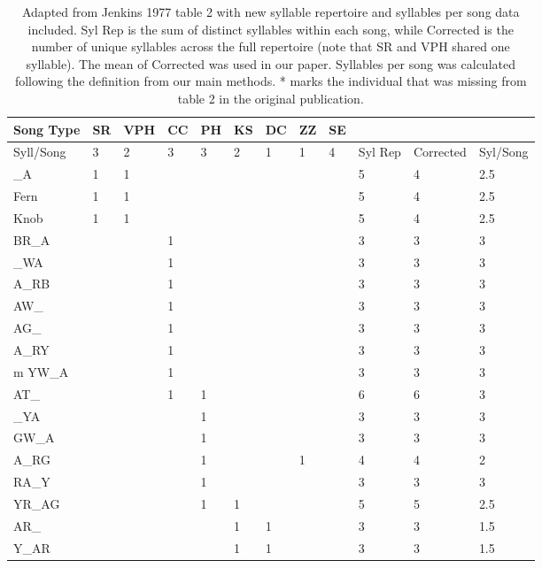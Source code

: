 \documentclass[a4paper,12pt]{article}
\begin{document}
\begin{table}[ht]
\caption{Adapted from Jenkins 1977 table 2 with new syllable repertoire and syllables per song data included. Syl Rep is the sum of distinct syllables within each song, while Corrected is the number of unique syllables across the full repertoire (note that SR and VPH shared one syllable). The mean of Corrected was used in our paper. Syllables per song was calculated following the definition from our main methods. * marks the individual that was missing from table 2 in the original publication.}
\centering

\begin{tabular}{|l|llllllll|lll|}
  \hline
Song Type & SR & VPH & CC & PH & KS & DC & ZZ & SE &  &  &  \\ 
  \hline
Syll/Song & 3 & 2 & 3 & 3 & 2 & 1 & 1 & 4 & Syl Rep & Corrected & Syl/Song \\ 
\hline
\hline
  \_A & 1 & 1 &  &  &  &  &  &  & 5 & 4 & 2.5 \\ 
  Fern & 1 & 1 &  &  &  &  &  &  & 5 & 4 & 2.5 \\ 
  Knob & 1 & 1 &  &  &  &  &  &  & 5 & 4 & 2.5 \\ 
  BR\_A &  &  & 1 &  &  &  &  &  & 3 & 3 & 3 \\ 
  \_WA &  &  & 1 &  &  &  &  &  & 3 & 3 & 3 \\ 
  A\_RB &  &  & 1 &  &  &  &  &  & 3 & 3 & 3 \\ 
  AW\_ &  &  & 1 &  &  &  &  &  & 3 & 3 & 3 \\ 
  AG\_ &  &  & 1 &  &  &  &  &  & 3 & 3 & 3 \\ 
  A\_RY &  &  & 1 &  &  &  &  &  & 3 & 3 & 3 \\ 
  m YW\_A &  &  & 1 &  &  &  &  &  & 3 & 3 & 3 \\ 
  AT\_ &  &  & 1 & 1 &  &  &  &  & 6 & 6 & 3 \\ 
  \_YA &  &  &  & 1 &  &  &  &  & 3 & 3 & 3 \\ 
  GW\_A &  &  &  & 1 &  &  &  &  & 3 & 3 & 3 \\ 
  A\_RG &  &  &  & 1 &  &  & 1 &  & 4 & 4 & 2 \\ 
  RA\_Y &  &  &  & 1 &  &  &  &  & 3 & 3 & 3 \\ 
  YR\_AG &  &  &  & 1 & 1 &  &  &  & 5 & 5 & 2.5 \\ 
  AR\_ &  &  &  &  & 1 & 1 &  &  & 3 & 3 & 1.5 \\ 
  Y\_AR &  &  &  &  & 1 & 1 &  &  & 3 & 3 & 1.5 \\ 

\end{tabular}
\end{table}
\end{document}
